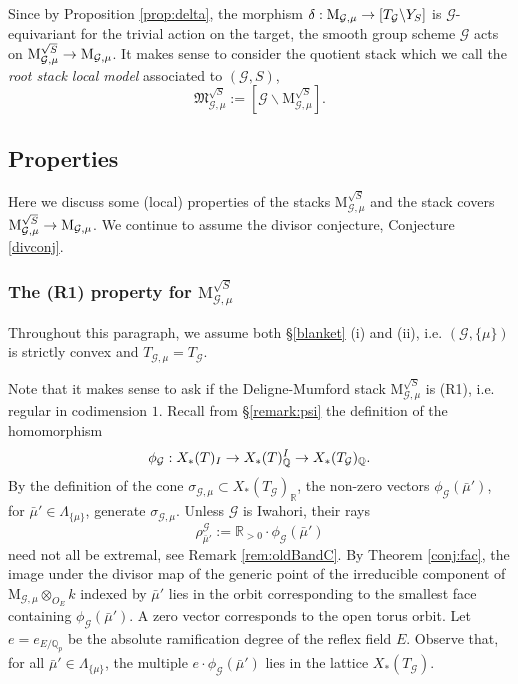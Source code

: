 \documentclass[reqno, 10pt]{amsart}
\makeatletter
\newcommand{\BQ}{\ensuremath{\mathbb {Q}}\xspace}
\newcommand{\BR}{\ensuremath{\mathbb {R}}\xspace}
\newcommand{\CG}{\ensuremath{\mathcal {G}}\xspace}
\newcommand{\RM}{\ensuremath{\mathrm {M}}\xspace}
\newcommand{\bs}{\backslash}
\theoremstyle{definition}
\numberwithin{equation}{subsection}
\numberwithin{subsubsection}{subsection}
\renewcommand{\to}{%
   \ifbool{@display}{\longrightarrow}{\rightarrow}%
   }
\newcommand{\Mloc}{{\rm M}}
\newcommand{\Mlocroot}{{\mathrm M}^{\sqrt{S}}}
\makeatother
\begin{document}
Since by Proposition \ref{prop:delta}, the morphism $\delta:  \Mloc_{\CG,\mu}\to [T_\CG \bs Y_S ]$ is $\CG$-equivariant for the trivial action on the target, the smooth group scheme $\CG$ acts on $ \Mlocroot_{\CG,\mu}\to  \Mloc_{\CG,\mu}$. It makes sense to consider the quotient stack which we call the \emph{root stack local model} associated to $(\CG, S)$,
\[
{\mathfrak M}^{\sqrt{S}}_{\CG,\mu}:=[\CG \bs \Mlocroot_{\CG,\mu}].
\]


\subsection{Properties} 

Here we discuss some (local) properties of  the stacks $\Mlocroot_{\CG,\mu}$ and the stack covers $\Mlocroot_{\CG,\mu}\to \Mloc_{\CG,\mu}$. 
We continue to assume the divisor conjecture, Conjecture \ref{divconj}.
 

\subsubsection{The (R1) property for $\Mlocroot_{\CG,\mu}$}


Throughout this paragraph, we assume both  \S \ref{blanket} (i) and (ii), i.e. $(\CG,\{\mu\})$ is strictly convex and $T_{\CG,\mu}=T_\CG$.

 Note that it makes sense to ask if the  Deligne-Mumford stack $\Mlocroot_{\CG,\mu}$ is (R1), i.e. regular in codimension $1$. 
 Recall from \S \ref{remark:psi} the definition of the homomorphism
  \[
  \phi_\CG: X_*(T)_I\to X_*(T)^I_\BQ\to X_*(T_\CG)_\BQ .
  \]
   By the definition of  the cone $\sigma_{\CG,\mu}\subset X_*(T_\CG)_\BR$, the non-zero vectors $\phi_\CG(\bar\mu')$, for $\bar\mu'\in \Lambda_{\{\mu\}}$,
   generate $\sigma_{\CG,\mu}$. Unless $\CG$ is Iwahori, their rays 
    \[
 \rho^\CG_{\bar\mu'}:=\BR_{>0}\cdot \phi_\CG(\bar\mu')
 \]
 need not all be extremal, see Remark \ref{rem:oldBandC}. By Theorem \ref{conj:fac}, the image under the divisor map of the generic point of the irreducible component of $\RM_{\CG,\mu}\otimes_{O_E}k$ indexed by $\bar\mu'$ lies in the orbit corresponding to the smallest face containing $\phi_\CG(\bar\mu')$. A zero vector corresponds to the open torus orbit.
Let $e=e_{E/\BQ_p}$ be the absolute ramification degree of the reflex field $E$. Observe that,  for all $\bar\mu'\in \Lambda_{\{\mu\}}$, the multiple  $e\cdot \phi_\CG(\bar\mu')$ lies in the lattice $X_*(T_\CG)$.
\end{document}
